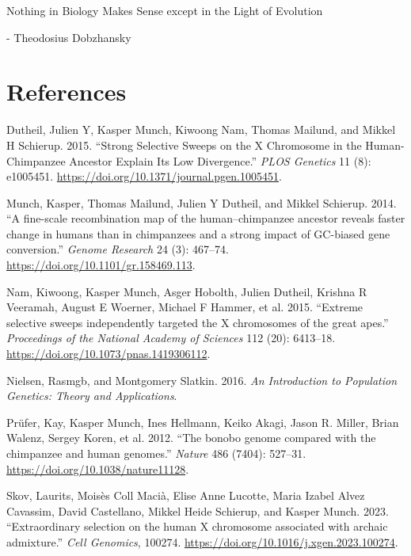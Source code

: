 \documentclass[
  a4paper,
]{scrbook}
\newlength{\cslhangindent}
\newenvironment{CSLReferences}[2] %
 {\begin{list}{}{%
  \setlength{\itemindent}{0pt}
  \setlength{\leftmargin}{0pt}
  \setlength{\parsep}{0pt}
  \ifodd #1
   \setlength{\leftmargin}{\cslhangindent}
   \setlength{\itemindent}{-1\cslhangindent}
  \fi
  \setlength{\itemsep}{#2\baselineskip}}}
 {\end{list}}
\renewenvironment{quote}{\begin{myquote}}{\end{myquote}}
\let\oldemph\emph
\renewcommand\emph[1]{\oldemph{\color{gray}#1}}
\begin{document}
\begin{quote}
Nothing in Biology Makes Sense except in the Light of Evolution

- Theodosius Dobzhansky
\end{quote}

\chapter{References}\label{references}

\label{refs}
\begin{CSLReferences}{1}{0}
Dutheil, Julien Y, Kasper Munch, Kiwoong Nam, Thomas Mailund, and Mikkel
H Schierup. 2015. {``{Strong Selective Sweeps on the X Chromosome in the
Human-Chimpanzee Ancestor Explain Its Low Divergence}.''} \emph{PLOS
Genetics} 11 (8): e1005451.
\url{https://doi.org/10.1371/journal.pgen.1005451}.

Munch, Kasper, Thomas Mailund, Julien Y Dutheil, and Mikkel Schierup.
2014. {``{A fine-scale recombination map of the human--chimpanzee
ancestor reveals faster change in humans than in chimpanzees and a
strong impact of GC-biased gene conversion}.''} \emph{Genome Research}
24 (3): 467--74. \url{https://doi.org/10.1101/gr.158469.113}.

Nam, Kiwoong, Kasper Munch, Asger Hobolth, Julien Dutheil, Krishna R
Veeramah, August E Woerner, Michael F Hammer, et al. 2015. {``{Extreme
selective sweeps independently targeted the X chromosomes of the great
apes}.''} \emph{Proceedings of the National Academy of Sciences} 112
(20): 6413--18. \url{https://doi.org/10.1073/pnas.1419306112}.

Nielsen, Rasmgb, and Montgomery Slatkin. 2016. \emph{An Introduction to
Population Genetics: Theory and Applications}.

Prüfer, Kay, Kasper Munch, Ines Hellmann, Keiko Akagi, Jason R. Miller,
Brian Walenz, Sergey Koren, et al. 2012. {``{The bonobo genome compared
with the chimpanzee and human genomes}.''} \emph{Nature} 486 (7404):
527--31. \url{https://doi.org/10.1038/nature11128}.

Skov, Laurits, Moisès Coll Macià, Elise Anne Lucotte, Maria Izabel Alvez
Cavassim, David Castellano, Mikkel Heide Schierup, and Kasper Munch.
2023. {``{Extraordinary selection on the human X chromosome associated
with archaic admixture}.''} \emph{Cell Genomics}, 100274.
\url{https://doi.org/10.1016/j.xgen.2023.100274}.

\end{CSLReferences}


\backmatter
\end{document}
